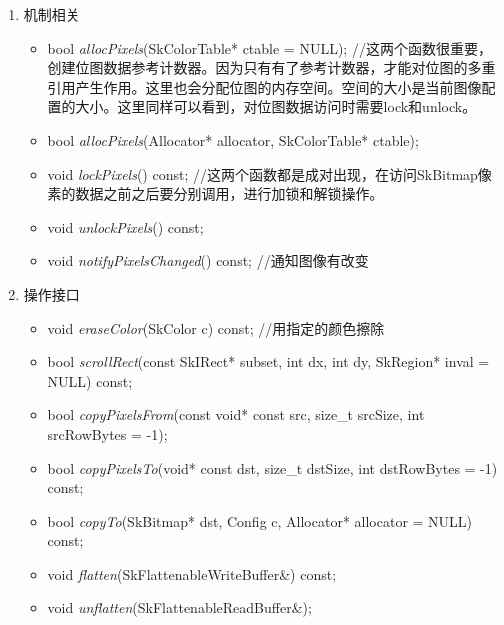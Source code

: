 \begin{enumerate}
\item 机制相关
  \begin{itemize}
  \item bool \textit{allocPixels}(SkColorTable* ctable = NULL); //这两个函数很重要，创建位图数据参考计数器。因为只有有了参考计数器，才能对位图的多重引用产生作用。这里也会分配位图的内存空间。空间的大小是当前图像配置的大小。这里同样可以看到，对位图数据访问时需要lock和unlock。
  \item bool \textit{allocPixels}(Allocator* allocator, SkColorTable* ctable);
  \item void \textit{lockPixels}() const; //这两个函数都是成对出现，在访问SkBitmap像素的数据之前之后要分别调用，进行加锁和解锁操作。
  \item void \textit{unlockPixels}() const;
  \item void \textit{notifyPixelsChanged}() const; //通知图像有改变
  \end{itemize}

\item 操作接口
  \begin{itemize}
  \item void \textit{eraseColor}(SkColor c) const; //用指定的颜色擦除
  \item bool \textit{scrollRect}(const SkIRect* subset, int dx, int dy, SkRegion* inval = NULL) const;
  \item bool \textit{copyPixelsFrom}(const void* const src, size\_t srcSize, int srcRowBytes = -1);
  \item bool \textit{copyPixelsTo}(void* const dst, size\_t dstSize, int dstRowBytes = -1) const;
  \item bool \textit{copyTo}(SkBitmap* dst, Config c, Allocator* allocator = NULL) const;
  \item void \textit{flatten}(SkFlattenableWriteBuffer\&) const;
  \item void \textit{unflatten}(SkFlattenableReadBuffer\&);
  \end{itemize}


\end{enumerate}
